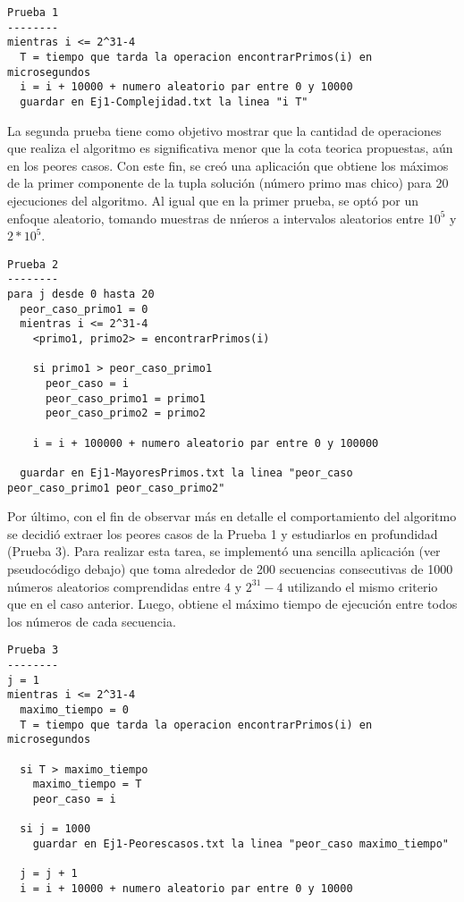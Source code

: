 \documentclass[a4paper,10pt] {article}
\begin{document}
\begin{verbatim}
Prueba 1
--------
mientras i <= 2^31-4
  T = tiempo que tarda la operacion encontrarPrimos(i) en microsegundos
  i = i + 10000 + numero aleatorio par entre 0 y 10000
  guardar en Ej1-Complejidad.txt la linea "i T"
\end{verbatim}

La segunda prueba tiene como objetivo mostrar que la cantidad de operaciones que realiza el algoritmo es significativa menor que la cota teorica propuestas, a\'un en los peores casos. Con este fin, se cre\'o una aplicaci\'on que obtiene los m\'aximos de la primer componente de la tupla soluci\'on (n\'umero primo mas chico) para 20 ejecuciones del algoritmo. Al igual que en la primer prueba, se opt\'o por un enfoque aleatorio, tomando muestras de n\'meros a intervalos aleatorios entre $10^{5}$ y $2*10^{5}$.

\begin{verbatim}
Prueba 2
--------
para j desde 0 hasta 20
  peor_caso_primo1 = 0
  mientras i <= 2^31-4
    <primo1, primo2> = encontrarPrimos(i)

    si primo1 > peor_caso_primo1
      peor_caso = i
      peor_caso_primo1 = primo1
      peor_caso_primo2 = primo2

    i = i + 100000 + numero aleatorio par entre 0 y 100000

  guardar en Ej1-MayoresPrimos.txt la linea "peor_caso peor_caso_primo1 peor_caso_primo2"
\end{verbatim}

Por \'ultimo, con el fin de observar m\'as en detalle el comportamiento del algoritmo se decidi\'o extraer los peores casos de la Prueba 1 y estudiarlos en profundidad (Prueba 3). Para realizar esta tarea, se implement\'o una sencilla aplicaci\'on (ver pseudoc\'odigo debajo) que toma alrededor de 200 secuencias consecutivas de 1000 n\'umeros aleatorios comprendidas entre $4$ y $2^{31}-4$ utilizando el mismo criterio que en el caso anterior. Luego, obtiene el m\'aximo tiempo de ejecuci\'on entre todos los n\'umeros de cada secuencia. 

\begin{verbatim}
Prueba 3
--------
j = 1
mientras i <= 2^31-4
  maximo_tiempo = 0
  T = tiempo que tarda la operacion encontrarPrimos(i) en microsegundos

  si T > maximo_tiempo
    maximo_tiempo = T
    peor_caso = i

  si j = 1000
    guardar en Ej1-Peorescasos.txt la linea "peor_caso maximo_tiempo"
  
  j = j + 1
  i = i + 10000 + numero aleatorio par entre 0 y 10000
\end{verbatim}
\end{document}

